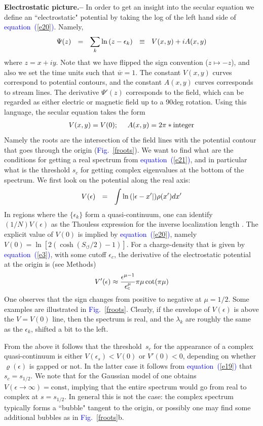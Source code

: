 \documentclass[aps,pre,floats,floatfix,twocolumn]{revtex4}
\newcommand{\be}[1]{\begin{eqnarray}\ifthenelse{#1=-1}{\nonumber}{\ifthenelse{#1=0}{}{\label{e#1}}}}
\newcommand{\eeq}{\end{eqnarray}}
\newcommand{\Eq}[1]{\textcolor{blue}{{equation}\!~(\ref{#1})}}
\newcommand{\Fig}[1]{\textcolor{blue}{Fig.}\!\!~\ref{#1}}
\newcommand{\sect}[1]{{\bf #1.-- }}
\begin{document}
\sect{Electrostatic picture}
%
In order to get an insight into the secular equation we 
define an ``electrostatic" potential by taking the log 
of the left hand side of \Eq{e20}. Namely, 
%
\be{22}
\Psi(z) \ \ = \ \ \sum_k \ln\left(z-\epsilon_k\right) \ \ \equiv \ \ V(x,y)+iA(x,y)
\eeq
%
where ${z=x+iy}$. Note that we have flipped the sign convention (${z\mapsto -z}$), 
and also we set the time units such that $\overline{w}=1$.
% 
The constant ${V(x,y)}$ curves correspond to potential contours,
and the constant ${A(x,y)}$ curves corresponds 
to stream lines. The derivative $\Psi'(z)$ corresponds to the field, 
which can be regarded as either electric or magnetic field up to a 90deg rotation.       
Using this language, the secular equation takes the form
%
\be{21}
V(x,y)=V(0); \ \ \ \ A(x,y)=2\pi*\text{integer} 
\eeq
%
Namely the roots are the intersection of the field lines with the 
potential contour that goes through the origin (\Fig{froots}). 
%
%
We want to find what are the conditions for getting 
a real spectrum from \Eq{e21}, and in particular what 
is the threshold $s_c$ for getting complex eigenvalues 
at the bottom of the spectrum. 
We first look on the potential along the real axis:
%
\be{23}
V(\epsilon) \ \ = \ \  \int \ln \left(|\epsilon-x' \right|) \rho(x')dx' 
\eeq
%
In regions where the $\{\epsilon_k\}$ form a quasi-continuum,  
one can identify $(1/N)V(\epsilon)$ as the Thouless expression  
for the inverse localization length \cite{Shnerb1}.
The explicit value of $V(0)$ is implied by \Eq{e20}, 
namely ${V(0)=\ln[2(\cosh(S_{\circlearrowleft}/2)-1)]}$.   
For a charge-density that is given by \Eq{e3}, with some cutoff $\epsilon_c$,
the derivative of the electrostatic potential at the origin is (see Methods)
%
\be{19}
V'(\epsilon) \approx  \frac{ \epsilon^{\mu-1}}{\epsilon_c^{\mu}} \pi \mu \cot(\pi \mu)
\eeq
%
One observes that the sign changes from positive to negative at $\mu=1/2$.
Some examples are illustrated in \Fig{froots}.
Clearly, if the envelope of $V(\epsilon)$ is above 
the $V=V(0)$ line, then the spectrum is real, and the $\lambda_k$ are roughly 
the same as the $\epsilon_k$, shifted a bit to the left. 


From the above it follows that the threshold~$s_c$ 
for the appearance of a complex quasi-continuum 
is either  ${V(\epsilon_s)<V(0)}$  or  ${V'(0)<0}$, 
depending on whether $\varrho(\epsilon)$ is gapped or not. 
In the latter case it follows from \Eq{e19} that ${s_c=s_{1/2}}$.
%
We note that for the Gaussian model of \cite{odh3}
one obtains ${V(\epsilon \rightarrow \infty) = \text{const}}$,  
implying that the entire spectrum would go from real to complex at $s=s_{1/2}$. 
In general this is not the case: the complex spectrum typically 
forms a ``bubble" tangent to the origin, or possibly 
one may find some additional bubbles as in \Fig{froots}b.   
\end{document}
